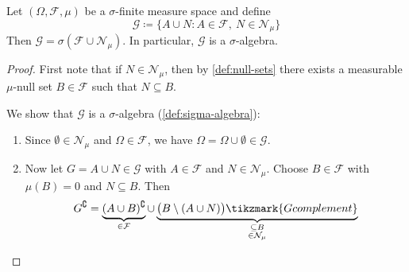 \begin{theorem}
\label{thm:concrete-description-completion}
Let $(\Omega,\mathcal{F},\mu)$ be a $\sigma$-finite measure space and define
\[
\mathcal{G} \coloneq \{A \cup N : A \in \mathcal{F},\ N \in \mathcal{N}_\mu\}
\]
Then
\(
\mathcal{G} = \sigma(\mathcal{F} \cup \mathcal{N}_\mu)
\).
In particular, $\mathcal{G}$ is a $\sigma$-algebra.
\end{theorem}

\begin{proof} %
First note that if $N \in \mathcal{N}_\mu$, then by \autoref{def:null-sets} there exists a measurable $\mu$-null set $B \in \mathcal{F}$ such that $N \subseteq B$.

We show that $\mathcal{G}$ is a $\sigma$-algebra (\autoref{def:sigma-algebra}):
\begin{enumerate}[label=(\roman*)]
\item
Since $\emptyset \in \mathcal{N}_\mu$ and $\Omega \in \mathcal{F}$, we have $\Omega = \Omega \cup \emptyset \in \mathcal{G}$.
\cmark
\item
Now let $G = A \cup N \in \mathcal{G}$ with $A \in \mathcal{F}$ and $N \in \mathcal{N}_\mu$. Choose $B \in \mathcal{F}$ with $\mu(B)=0$ and $N \subseteq B$. Then
\tikzexternaldisable
\[
G^\complement = 
\underbrace{(A \cup B)^\complement}_{\in \mathcal{F}}
\cup 
\underbrace{\bigl(B \setminus (A \cup N)\bigr)\tikzmark{Gcomplement}}_{\substack{\subseteq B \\ \in \mathcal{N}_\mu}}%
\]
%
\end{enumerate}
\end{proof}

